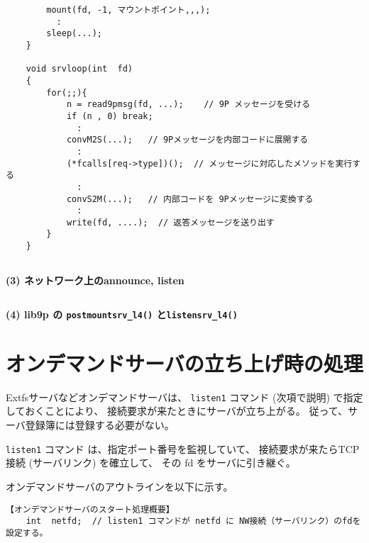 {{\begin{verbatim}
        mount(fd, -1, マウントポイント,,,);
          :
        sleep(...);  
    }
   
    void srvloop(int  fd)
    {
        for(;;){ 
            n = read9pmsg(fd, ...);    // 9P メッセージを受ける
            if (n , 0) break;
              :
            convM2S(...);   // 9Pメッセージを内部コードに展開する
              :
            (*fcalls[req->type])();  // メッセージに対応したメソッドを実行する
              :
            convS2M(...);   // 内部コードを 9Pメッセージに変換する 
              :
            write(fd, ....);  // 返答メッセージを送り出す
        }
    }


\end{verbatim}
}


\vspace{4cm}



{\bf\flushleft  (3) ネットワーク上のannounce, listen}

{\small
\begin{verbatim}

\end{verbatim}
}



\vspace{4cm}

{\bf\flushleft  (4) lib9p の \verb|postmountsrv_l4()| と\verb|listensrv_l4()| }

\vspace{4cm}



\section{オンデマンドサーバの立ち上げ時の処理}

Extfsサーバなどオンデマンドサーバは、
{\tt listen1} コマンド (次項で説明) で指定しておくことにより、
接続要求が来たときにサーバが立ち上がる。
従って、サーバ登録簿には登録する必要がない。

{\tt listen1} コマンド は、指定ポート番号を監視していて、
接続要求が来たらTCP接続 (サーバリンク) を確立して、
その fd をサーバに引き継ぐ。

オンデマンドサーバのアウトラインを以下に示す。



{\small
\begin{verbatim}
【オンデマンドサーバのスタート処理概要】 
    int  netfd;  // listen1 コマンドが netfd に NW接続（サーバリンク）のfdを設定する。


\end{verbatim}}}
